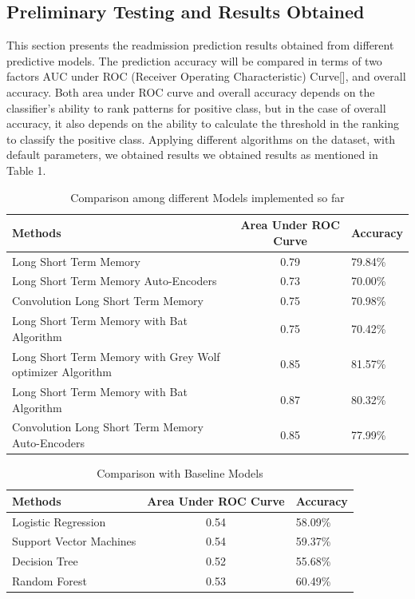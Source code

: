 \documentclass[12pt,a4paper]{article}
\begin{document}
\subsection{Preliminary Testing and Results Obtained}
This section presents the readmission prediction results obtained from different predictive models. The prediction accuracy will be compared in terms of two factors AUC under ROC (Receiver Operating Characteristic) Curve[], and overall accuracy. Both area under ROC curve and overall accuracy
depends on the classifier’s ability to rank patterns for positive class, but in the case of overall accuracy, it also depends on the ability to calculate the threshold in the ranking to classify the positive class. Applying different algorithms on the dataset, with default parameters, we obtained results we obtained results as mentioned in Table 1.
\begin{table}[h]
\centering
\begin{tabular}{ p{5cm} | c | p{2cm}}
Methods & Area Under ROC Curve & Accuracy\\
\hline \hline
Long Short Term Memory & 0.79 & 79.84\%\\
\hline
Long Short Term Memory Auto-Encoders & 0.73 & 70.00\%\\
\hline
Convolution Long Short Term Memory & 0.75 & 70.98\%\\
\hline
Long Short Term Memory with Bat Algorithm & 0.75 & 70.42\%\\
\hline
Long Short Term Memory with Grey Wolf optimizer Algorithm & 0.85 & 81.57\%\\
\hline
Long Short Term Memory with Bat Algorithm & 0.87 & 80.32\%\\
\hline
Convolution Long Short Term  Memory  Auto-Encoders & 0.85 & 77.99\%\\
\hline
\end{tabular}
\caption{Comparison among different Models implemented so far}
\label{tab:tri}
\end{table}

\begin{table}[h]
\centering
\begin{tabular}{ p{5cm} | c | p{2cm}}
Methods & Area Under ROC Curve & Accuracy\\
\hline \hline
Logistic Regression & 0.54 & 58.09\%\\
\hline
Support Vector Machines & 0.54 & 59.37\%\\
\hline
Decision Tree & 0.52 & 55.68\%\\
\hline
Random Forest & 0.53 & 60.49\%\\
\hline
\end{tabular}
\caption{Comparison with Baseline Models}
\label{tab:tri}
\end{table}
\end{document}
